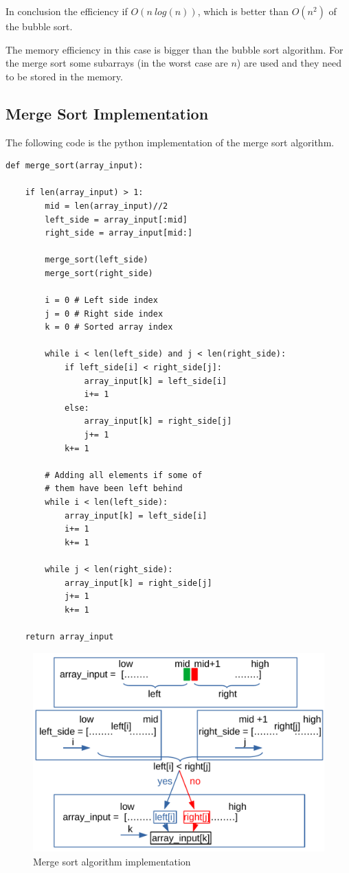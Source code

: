 In conclusion the efficiency if \(O(n \ log(n))\), which is better than \(O(n^{2})\) of the bubble sort. 

The memory efficiency in this case is bigger than the bubble sort algorithm. For the merge sort some subarrays (in the worst case are \(n\)) are used and they need to be stored in the memory.

\subsection{Merge Sort Implementation}
The following code is the python implementation of the merge sort algorithm.
\begin{lstlisting}[firstnumber=1, caption={Merge Sort python implementation.}]
def merge_sort(array_input):
	
	if len(array_input) > 1:
		mid = len(array_input)//2
		left_side = array_input[:mid]
		right_side = array_input[mid:]
		
		merge_sort(left_side)
		merge_sort(right_side)
		
		i = 0 # Left side index
		j = 0 # Right side index
		k = 0 # Sorted array index
		
		while i < len(left_side) and j < len(right_side):
			if left_side[i] < right_side[j]:
				array_input[k] = left_side[i]
				i+= 1
			else:
				array_input[k] = right_side[j]
				j+= 1
			k+= 1
			
		# Adding all elements if some of 
        # them have been left behind 
        while i < len(left_side): 
        	array_input[k] = left_side[i] 
            i+= 1
            k+= 1
            
        while j < len(right_side): 
        	array_input[k] = right_side[j] 
            j+= 1
            k+= 1
			
	return array_input
\end{lstlisting}

\begin{figure}[H]
	\begin{center}
		\includegraphics[scale=.6]{chapters/searchandsorting/images/sorting_7.pdf}
		\caption[Merge sort algorithm implementation]{Merge sort algorithm implementation}
		\label{sorting_7}
	\end{center}
\end{figure}

